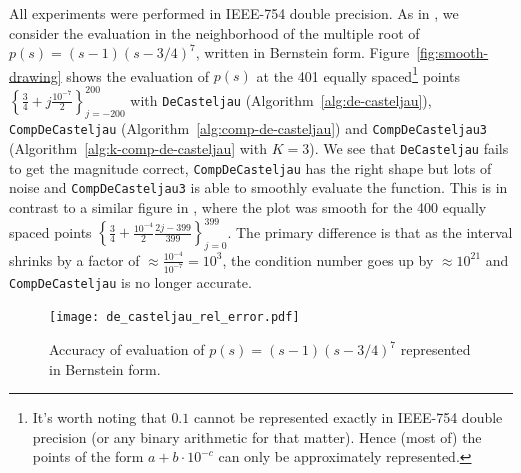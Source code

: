 \documentclass[3p, authoryear, square]{elsarticle}
\theoremstyle{definition}
\begin{document}
All experiments were performed in IEEE-754 double precision.
As in \cite{Jiang2010}, we consider the evaluation in the neighborhood
of the multiple root of \(p(s) = (s - 1)\left(s - 3/4\right)^7\),
written in Bernstein form.
Figure~\ref{fig:smooth-drawing} shows the evaluation of \(p(s)\) at
the 401 equally spaced\footnote{It's worth noting that \(0.1\) cannot
be represented exactly in IEEE-754 double precision (or any binary
arithmetic for that matter). Hence (most of) the points of the form
\(a + b \cdot 10^{-c}\) can only be approximately represented.} points
\(\left\{\frac{3}{4} + j \frac{10^{-7}}{2}\right\}_{j=-200}^{200}\)
with \texttt{DeCasteljau} (Algorithm~\ref{alg:de-casteljau}),
\texttt{CompDeCasteljau} (Algorithm~\ref{alg:comp-de-casteljau})
and \texttt{CompDeCasteljau3} (Algorithm~\ref{alg:k-comp-de-casteljau}
with \(K = 3\)). We see that \texttt{DeCasteljau} fails to get the
magnitude correct, \texttt{CompDeCasteljau} has the right shape but
lots of noise and \texttt{CompDeCasteljau3} is able to smoothly evaluate
the function. This is in contrast to a similar figure in \cite{Jiang2010},
where the plot was smooth for the 400 equally spaced points
\(\left\{\frac{3}{4} + \frac{10^{-4}}{2} \frac{2j - 399}{399}
\right\}_{j=0}^{399}\). The primary difference is that as the interval
shrinks by a factor of \(\approx \frac{10^{-4}}{10^{-7}} = 10^3\), the
condition number goes up by \(\approx 10^{21}\) and \texttt{CompDeCasteljau}
is no longer accurate.

\begin{figure}
  \texttt{[image: de\_casteljau\_rel\_error.pdf]}
  \centering
  \captionsetup{width=.75\linewidth}
  \caption{Accuracy of evaluation of \(p(s) = (s - 1)\left(s - 3/4\right)^7\)
    represented in Bernstein form.}
  \label{fig:compensated-k}
\end{figure}
\end{document}
